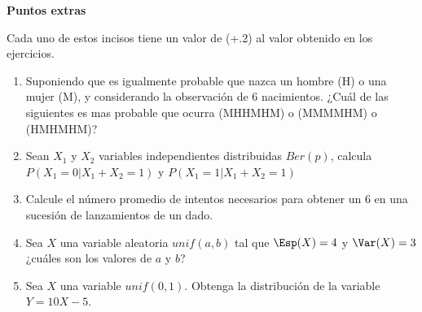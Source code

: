 \documentclass{assignment}
\begin{document}
\begin{enumerate}
\begin{center}
     \textbf{Puntos extras}
\end{center}
Cada uno de estos incisos tiene un valor de (+.2) al valor obtenido en los ejercicios.  

\begin{enumerate}
    \item Suponiendo que es igualmente probable que nazca un hombre (H)  o una mujer (M), y considerando la observación de 6 nacimientos. ¿Cuál de las siguientes es mas probable que ocurra (MHHMHM) o (MMMMHM) o (HMHMHM)?
    \item Sean $X_1$ y $X_2$ variables independientes distribuidas $Ber(p)$, calcula $P(X_1=0|X_1+X_2=1)$ y $P(X_1=1|X_1+X_2=1)$
    \item Calcule el número promedio de intentos necesarios para obtener un 6 en una sucesión de lanzamientos de un dado.  
    \item Sea $X$ una variable aleatoria $unif(a,b)$ tal que $\Esp(X)=4$ y $\Var(X)=3$ ¿cuáles son los valores de $a$ y $b$?
    \item Sea $X$ una variable $unif(0,1)$. Obtenga la distribución de la variable $Y=10X-5$.  
    \end{enumerate}

\end{enumerate}
\end{document}
